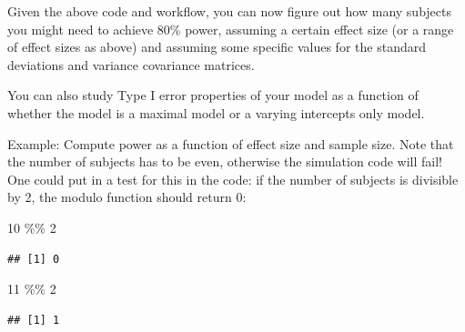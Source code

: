 \documentclass[
  12pt,
]{krantz}
\newenvironment{Shaded}{\begin{snugshade}}{\end{snugshade}}
\newcommand{\DecValTok}[1]{\textcolor[rgb]{0.00,0.00,0.81}{#1}}
\newcommand{\SpecialCharTok}[1]{\textcolor[rgb]{0.00,0.00,0.00}{#1}}
\theoremstyle{definition}
\theoremstyle{definition}
\theoremstyle{definition}
\theoremstyle{definition}
\theoremstyle{remark}
\begin{document}
Given the above code and workflow, you can now figure out how many subjects you might need to achieve 80\% power, assuming a certain effect size (or a range of effect sizes as above) and assuming some specific values for the standard deviations and variance covariance matrices.

You can also study Type I error properties of your model as a function of whether the model is a maximal model or a varying intercepts only model.

Example: Compute power as a function of effect size and sample size. Note that the number of subjects has to be even, otherwise the simulation code will fail! One could put in a test for this in the code: if the number of subjects is divisible by 2, the modulo function should return 0:

\begin{Shaded}
\begin{Highlighting}[]
\DecValTok{10} \SpecialCharTok{\%\%} \DecValTok{2}
\end{Highlighting}
\end{Shaded}

\begin{verbatim}
## [1] 0
\end{verbatim}

\begin{Shaded}
\begin{Highlighting}[]
\DecValTok{11} \SpecialCharTok{\%\%} \DecValTok{2}
\end{Highlighting}
\end{Shaded}

\begin{verbatim}
## [1] 1
\end{verbatim}
\end{document}
